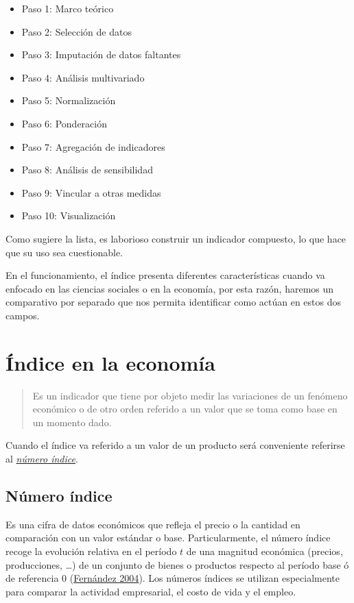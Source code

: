 \documentclass[
  11pt,
]{book}
\begin{document}
\begin{itemize}
\item
  Paso 1: Marco teórico
\item
  Paso 2: Selección de datos
\item
  Paso 3: Imputación de datos faltantes
\item
  Paso 4: Análisis multivariado
\item
  Paso 5: Normalización
\item
  Paso 6: Ponderación
\item
  Paso 7: Agregación de indicadores
\item
  Paso 8: Análisis de sensibilidad
\item
  Paso 9: Vincular a otras medidas
\item
  Paso 10: Visualización
\end{itemize}

Como sugiere la lista, es laborioso construir un indicador compuesto, lo que hace que su uso sea cuestionable.

En el funcionamiento, el índice presenta diferentes características cuando va enfocado en las ciencias sociales o en la economía, por esta razón, haremos un comparativo por separado que nos permita identificar como actúan en estos dos campos.

\hypertarget{uxedndice-en-la-economuxeda}{%
\section{Índice en la economía}\label{uxedndice-en-la-economuxeda}}

\begin{quote}
Es un indicador que tiene por objeto medir las variaciones de un fenómeno económico o de otro orden referido a un valor que se toma como base en un momento dado.
\end{quote}

Cuando el índice va referido a un valor de un producto será conveniente referirse al \protect\hyperlink{numeroindice}{\emph{número índice}}.

\hypertarget{numeroindice}{%
\subsection{Número índice}\label{numeroindice}}

Es una cifra de datos económicos que refleja el precio o la cantidad en comparación con un valor estándar o base. Particularmente, el número índice recoge la evolución relativa en el período \(t\) de una magnitud económica (precios, producciones, \ldots) de un conjunto de bienes o productos respecto al período base ó de referencia 0 (\protect\hyperlink{ref-fernandez2004introduccion}{Fernández 2004}). Los números índices se utilizan especialmente para comparar la actividad empresarial, el costo de vida y el empleo.
\end{document}
